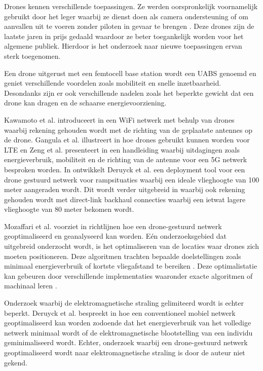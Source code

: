 \documentclass[twocolumn]{phdsymp_dutch}
\begin{document}
Drones kennen verschillende toepassingen. Ze werden oorspronkelijk voornamelijk gebruikt door het leger waarbij ze dienst doen  
als camera ondersteuning of om aanvallen uit te voeren zonder piloten in gevaar te brengen \cite{U12}. 
Deze drones zijn de laatste jaren in prijs gedaald waardoor ze beter toegankelijk worden
voor het algemene publiek. Hierdoor is het onderzoek naar nieuwe toepassingen ervan sterk toegenomen.

Een drone uitgerust met een femtocell base station wordt een \gls{UABS} genoemd en 
geniet verschillende voordelen zoals mobiliteit en snelle inzetbaarheid.
Desondanks zijn er ook verschillende nadelen zoals het beperkte gewicht dat een drone kan dragen 
en de schaarse energievoorziening.

Kawamoto et al. introduceert in \cite{U11} een WiFi netwerk  met behulp van drones waarbij rekening gehouden wordt
met de richting van de geplaatste antennes op de drone. 
Gangula et al. illustreert in \cite{U10} hoe drones gebruikt kunnen worden voor \gls{LTE}
en
Zeng et al. presenteert in  \cite{U12} een handleiding waarbij uitdagingen   zoals energieverbruik, mobiliteit en 
de richting van de antenne voor een 5G netwerk besproken worden. 
In \cite{J2} ontwikkelt Deruyck et al. een deployment tool voor een drone gestuurd netwerk voor rampsituaties waarbij 
een ideale vlieghoogte van 100 meter aangeraden wordt.  
Dit wordt verder uitgebreid in \cite{U1} waarbij ook rekening gehouden wordt met 
 direct-link backhaul connecties waarbij een ietwat lagere vlieghoogte van 80 meter bekomen wordt.

Mozaffari et al. voorziet in \cite{U3} richtlijnen hoe een drone-gestuurd netwerk geoptimaliseerd en geanalyseerd kan worden.
Eén onderzoeksgebied dat uitgebreid onderzocht wordt, is het optimaliseren van de locaties waar drones zich moeten positioneren.
Deze algoritmen trachten bepaalde doelstellingen zoals minimaal energieverbruik of kortste vliegafstand te bereiken \cite{U6,U7,U8,U9}.
Deze optimalistatie kan gebeuren door verschillende implementaties waaronder exacte algoritmen of machinaal leren \cite{U3,U5}.

Onderzoek waarbij de elektromagnetische straling gelimiteerd wordt is echter beperkt.
Deruyck et al. bespreekt in \cite{J1} hoe een conventioneel mobiel netwerk geoptimaliseerd kan worden zodoende dat het energieverbruik 
van het volledige netwerk minimaal wordt of de elektromagnetische blootstelling van een individu geminimaliseerd wordt.
Echter, onderzoek waarbij een drone-gestuurd netwerk geoptimaliseerd wordt naar elektromagnetische straling is 
door de auteur niet gekend.
\end{document}
